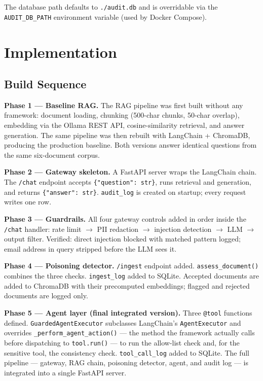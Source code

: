 \documentclass[11pt,a4paper]{article}
\begin{document}
The database path defaults to \texttt{./audit.db} and is overridable via the
\texttt{AUDIT\_DB\_PATH} environment variable (used by Docker Compose).

\section{Implementation}

\subsection{Build Sequence}

\textbf{Phase 1 --- Baseline RAG.}
The RAG pipeline was first built without any framework: document loading,
chunking (500-char chunks, 50-char overlap), embedding via the Ollama REST API,
cosine-similarity retrieval, and answer generation. The same pipeline was then
rebuilt with LangChain + ChromaDB, producing the production baseline. Both
versions answer identical questions from the same six-document corpus.

\textbf{Phase 2 --- Gateway skeleton.}
A FastAPI server wraps the LangChain chain. The \texttt{/chat} endpoint accepts
\texttt{\{"question": str\}}, runs retrieval and generation, and returns
\texttt{\{"answer": str\}}. \texttt{audit\_log} is created on startup; every
request writes one row.

\textbf{Phase 3 --- Guardrails.}
All four gateway controls added in order inside the \texttt{/chat} handler:
rate limit $\to$ PII redaction $\to$ injection detection $\to$ LLM $\to$
output filter. Verified: direct injection blocked with matched pattern logged;
email address in query stripped before the LLM sees it.

\textbf{Phase 4 --- Poisoning detector.}
\texttt{/ingest} endpoint added. \texttt{assess\_document()} combines the
three checks. \texttt{ingest\_log} added to SQLite. Accepted documents are
added to ChromaDB with their precomputed embeddings; flagged and rejected
documents are logged only.

\textbf{Phase 5 --- Agent layer (final integrated version).}
Three \texttt{@tool} functions defined. \texttt{GuardedAgentExecutor}
subclasses LangChain's \texttt{AgentExecutor} and overrides
\texttt{\_perform\_agent\_action()} --- the method the framework actually
calls before dispatching to \texttt{tool.run()} --- to run the allow-list
check and, for the sensitive tool, the consistency check.
\texttt{tool\_call\_log} added to SQLite. The full pipeline --- gateway, RAG
chain, poisoning detector, agent, and audit log --- is integrated into a
single FastAPI server.
\end{document}
